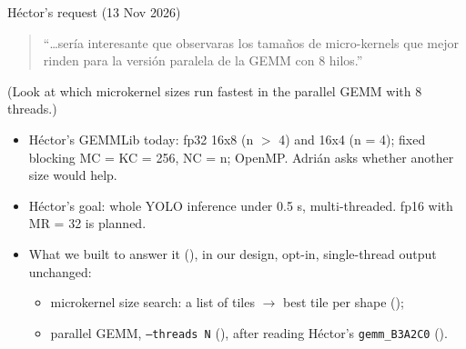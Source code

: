 \begin{frame}{H\'ector's request (13 Nov 2026)}
\begin{quote}\small
``\ldots sería interesante que observaras los tamaños de micro-kernels que mejor rinden para la versión paralela de la GEMM con 8 hilos.''
\end{quote}
\small (Look at which microkernel sizes run fastest in the parallel GEMM with 8 threads.)
\vspace{6pt}
\begin{itemize}\setlength\itemsep{3pt}
\item H\'ector's GEMMLib today: fp32 16x8 (n $>$ 4) and 16x4 (n = 4); fixed blocking MC = KC = 256, NC = n; OpenMP. Adri\'an asks whether another size would help.
\item H\'ector's goal: whole YOLO inference under 0.5 s, multi-threaded. fp16 with MR = 32 is planned.
\item What we built to answer it (), in our design, opt-in, single-thread output unchanged:
  \begin{itemize}
  \item microkernel size search: a list of tiles $\to$ best tile per shape ();
  \item parallel GEMM, \texttt{--threads N} (), after reading H\'ector's \texttt{gemm\_B3A2C0} ().
  \end{itemize}
\end{itemize}
\end{frame}

